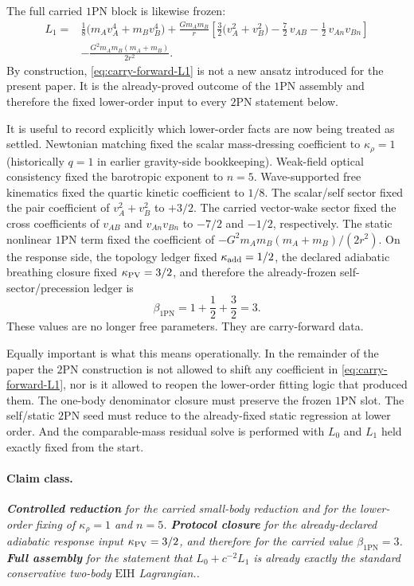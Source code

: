 \documentclass[11pt]{article}
\newcommand{\OnePN}{\mathrm{1PN}}
\newcommand{\TwoPN}{\mathrm{2PN}}
\newcommand{\EIH}{\mathrm{EIH}}
\newcommand{\krho}{\kappa_{\rho}}
\newcommand{\Controlled}{\textbf{Controlled reduction}}
\newcommand{\Protocol}{\textbf{Protocol closure}}
\newcommand{\FullMatch}{\textbf{Full assembly}}
\newcommand{\claimclass}[1]{\paragraph{Claim class.}\emph{#1.}}
\begin{document}
The full carried \(\OnePN\) block is likewise frozen:
\begin{align}
L_1={}&
\frac18\bigl(m_A v_A^4+m_B v_B^4\bigr)
+\frac{Gm_A m_B}{r}
\left[
\frac32\bigl(v_A^2+v_B^2\bigr)
-\frac72\,v_{AB}
-\frac12\,v_{An}v_{Bn}
\right]
\nonumber\\
&
-\frac{G^2m_A m_B(m_A+m_B)}{2r^2}.
\label{eq:carry-forward-L1}
\end{align}
By construction, \cref{eq:carry-forward-L1} is not a new ansatz introduced for the
present paper. It is the already-proved outcome of the \(\OnePN\) assembly and therefore
the fixed lower-order input to every \(\TwoPN\) statement below.

It is useful to record explicitly which lower-order facts are now being treated as
settled.
Newtonian matching fixed the scalar mass-dressing coefficient to
\(\krho=1\) (historically \(q=1\) in earlier gravity-side bookkeeping).
Weak-field optical consistency fixed the barotropic exponent to
\(n=5\).
Wave-supported free kinematics fixed the quartic kinetic coefficient to \(1/8\).
The scalar/self sector fixed the pair coefficient of \(v_A^2+v_B^2\) to \(+3/2\).
The carried vector-wake sector fixed the cross coefficients of \(v_{AB}\) and
\(v_{An}v_{Bn}\) to \(-7/2\) and \(-1/2\), respectively.
The static nonlinear \(\OnePN\) term fixed the coefficient of
\(-G^2m_A m_B(m_A+m_B)/(2r^2)\).
On the response side, the topology ledger fixed
\(\kappa_{\rm add}=1/2\), the declared adiabatic breathing closure fixed
\(\kappa_{\rm PV}=3/2\), and therefore the already-frozen self-sector/precession ledger is
\begin{equation}
\beta_{\OnePN}=1+\frac12+\frac32=3.
\label{eq:carry-forward-beta1pn}
\end{equation}
These values are no longer free parameters. They are carry-forward data.

Equally important is what this means operationally. In the remainder of the paper the
\(\TwoPN\) construction is not allowed to shift any coefficient in
\cref{eq:carry-forward-L1}, nor is it allowed to reopen the lower-order fitting logic
that produced them. The one-body denominator closure must preserve the frozen
\(\OnePN\) slot. The self/static \(\TwoPN\) seed must reduce to the already-fixed static
regression at lower order. And the comparable-mass residual solve is performed with
\(L_0\) and \(L_1\) held exactly fixed from the start.

\claimclass{\Controlled{} for the carried small-body reduction and for the lower-order
fixing of \(\krho=1\) and \(n=5\). \Protocol{} for the already-declared adiabatic response
input \(\kappa_{\rm PV}=3/2\), and therefore for the carried value
\(\beta_{\OnePN}=3\). \FullMatch{} for the statement that
\(L_0+c^{-2}L_1\) is already exactly the standard conservative two-body \(\EIH\)
Lagrangian.}
\end{document}
